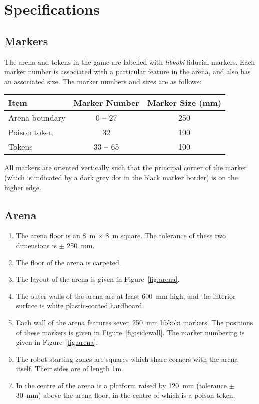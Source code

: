 \section{Specifications}
\label{sec:specs}

\subsection{Markers}
\label{spec:markers}

The arena and tokens in the game are labelled with \emph{libkoki} fiducial
markers. Each marker number is associated with a particular feature in the
arena, and also has an associated size. The marker numbers and sizes are as
follows:

\begin{center}
\begin{tabular}{lcc}
  \toprule
  \textbf{Item} & \textbf{Marker Number} & \textbf{Marker Size (\si{mm})} \\
  \midrule
  Arena boundary & 0 -- 27 & 250 \\
  Poison token & 32 & 100 \\
  Tokens & 33 -- 65 & 100 \\
  \bottomrule
\end{tabular}
\end{center}

All markers are oriented vertically such that the principal corner of the marker
(which is indicated by a dark grey dot in the black marker border) is on the
higher edge.

\subsection{Arena}
\label{spec:arena}

\begin{enumerate}
  \item The arena floor is an \SI{8}{m} $\times$ \SI{8}{m} square. The tolerance
        of these two dimensions is $\pm$ \SI{250}{mm}.
  \item The floor of the arena is carpeted.
  \item The layout of the arena is given in Figure~\ref{fig:arena}.
  \item The outer walls of the arena are at least \SI{600}{mm} high, and the
        interior surface is white plastic-coated hardboard.
  \item Each wall of the arena features seven \SI{250}{mm} libkoki markers.
        The positions of these markers is given in Figure~\ref{fig:sidewall}.
        The marker numbering is given in Figure~\ref{fig:arena}.
  \item The robot starting zones are squares which share corners with the arena
        itself. Their sides are of length \si{1}{m}.
  \item In the centre of the arena is a platform raised by \SI{120}{mm}
        (tolerance $\pm$ \SI{30}{mm}) above the arena floor, in the centre of
        which is a poison token.
\end{enumerate}

